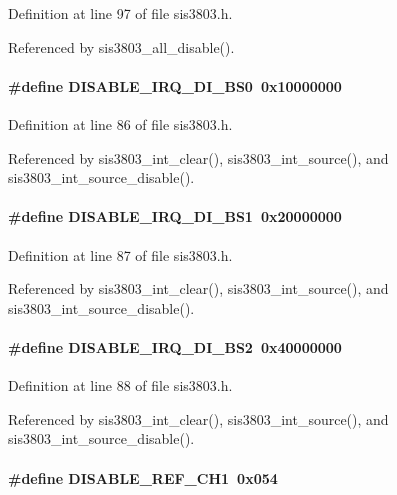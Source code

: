 Definition at line 97 of file sis3803.h.

Referenced by sis3803\_\-all\_\-disable().
\paragraph[{DISABLE\_\-IRQ\_\-DI\_\-BS0}]{\setlength{\rightskip}{0pt plus 5cm}\#define DISABLE\_\-IRQ\_\-DI\_\-BS0~0x10000000}\hfill\label{sis3803_8h_a88d0de89b426677dc6299e17609622c7}


Definition at line 86 of file sis3803.h.

Referenced by sis3803\_\-int\_\-clear(), sis3803\_\-int\_\-source(), and sis3803\_\-int\_\-source\_\-disable().
\paragraph[{DISABLE\_\-IRQ\_\-DI\_\-BS1}]{\setlength{\rightskip}{0pt plus 5cm}\#define DISABLE\_\-IRQ\_\-DI\_\-BS1~0x20000000}\hfill\label{sis3803_8h_a9633414b965797d3fa407baaa64b72e9}


Definition at line 87 of file sis3803.h.

Referenced by sis3803\_\-int\_\-clear(), sis3803\_\-int\_\-source(), and sis3803\_\-int\_\-source\_\-disable().
\paragraph[{DISABLE\_\-IRQ\_\-DI\_\-BS2}]{\setlength{\rightskip}{0pt plus 5cm}\#define DISABLE\_\-IRQ\_\-DI\_\-BS2~0x40000000}\hfill\label{sis3803_8h_ad6b92d1ef29cabc1c3970caf446b1867}


Definition at line 88 of file sis3803.h.

Referenced by sis3803\_\-int\_\-clear(), sis3803\_\-int\_\-source(), and sis3803\_\-int\_\-source\_\-disable().
\paragraph[{DISABLE\_\-REF\_\-CH1}]{\setlength{\rightskip}{0pt plus 5cm}\#define DISABLE\_\-REF\_\-CH1~0x054}\hfill\label{sis3803_8h_a9af025398763d33c47eb9d6d8f43551d}


